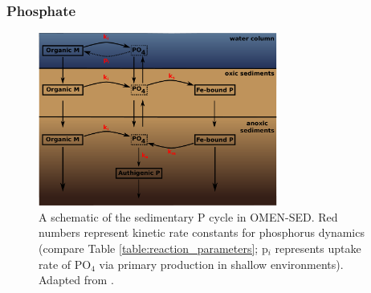 \documentclass[gmd, manuscript]{copernicus}
\begin{document}


\subsubsection{Phosphate}\label{subsubsec:P}

\begin{figure}[htbp]
\begin{center}
	\includegraphics[width=0.7\textwidth]{figures/P-cycle.pdf}
	\caption{A schematic of the sedimentary P cycle in OMEN-SED. Red numbers represent kinetic rate constants for phosphorus dynamics (compare Table \ref{table:reaction_parameters}; p$_i$ represents uptake rate of PO$_4$ 
	via primary production in shallow environments). Adapted from \citet{caroline_p_slomp_key_1996}.}
	\label{fig:P-cycle}
	\end{center}
\end{figure}
\end{document}
